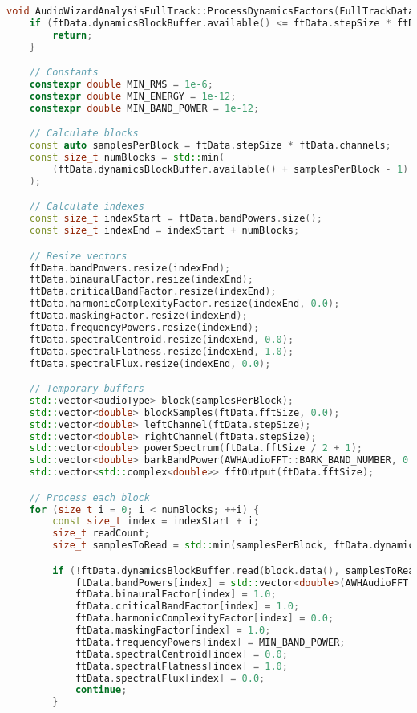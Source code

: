 \documentclass[11pt]{article}
\begin{document}
\begin{lstlisting}[language=C++]
void AudioWizardAnalysisFullTrack::ProcessDynamicsFactors(FullTrackData& ftData) {
	if (ftData.dynamicsBlockBuffer.available() <= ftData.stepSize * ftData.channels) {
		return;
	}

	// Constants
	constexpr double MIN_RMS = 1e-6;
	constexpr double MIN_ENERGY = 1e-12;
	constexpr double MIN_BAND_POWER = 1e-12;

	// Calculate blocks
	const auto samplesPerBlock = ftData.stepSize * ftData.channels;
	const size_t numBlocks = std::min(
		(ftData.dynamicsBlockBuffer.available() + samplesPerBlock - 1) / samplesPerBlock, ftData.pureDynamicsBlockSums.size()
	);

	// Calculate indexes
	const size_t indexStart = ftData.bandPowers.size();
	const size_t indexEnd = indexStart + numBlocks;

	// Resize vectors
	ftData.bandPowers.resize(indexEnd);
	ftData.binauralFactor.resize(indexEnd);
	ftData.criticalBandFactor.resize(indexEnd);
	ftData.harmonicComplexityFactor.resize(indexEnd, 0.0);
	ftData.maskingFactor.resize(indexEnd);
	ftData.frequencyPowers.resize(indexEnd);
	ftData.spectralCentroid.resize(indexEnd, 0.0);
	ftData.spectralFlatness.resize(indexEnd, 1.0);
	ftData.spectralFlux.resize(indexEnd, 0.0);

	// Temporary buffers
	std::vector<audioType> block(samplesPerBlock);
	std::vector<double> blockSamples(ftData.fftSize, 0.0);
	std::vector<double> leftChannel(ftData.stepSize);
	std::vector<double> rightChannel(ftData.stepSize);
	std::vector<double> powerSpectrum(ftData.fftSize / 2 + 1);
	std::vector<double> barkBandPower(AWHAudioFFT::BARK_BAND_NUMBER, 0.0);
	std::vector<std::complex<double>> fftOutput(ftData.fftSize);

	// Process each block
	for (size_t i = 0; i < numBlocks; ++i) {
		const size_t index = indexStart + i;
		size_t readCount;
		size_t samplesToRead = std::min(samplesPerBlock, ftData.dynamicsBlockBuffer.available());

		if (!ftData.dynamicsBlockBuffer.read(block.data(), samplesToRead, &readCount) || readCount == 0) {
			ftData.bandPowers[index] = std::vector<double>(AWHAudioFFT::BARK_BAND_NUMBER, MIN_BAND_POWER);
			ftData.binauralFactor[index] = 1.0;
			ftData.criticalBandFactor[index] = 1.0;
			ftData.harmonicComplexityFactor[index] = 0.0;
			ftData.maskingFactor[index] = 1.0;
			ftData.frequencyPowers[index] = MIN_BAND_POWER;
			ftData.spectralCentroid[index] = 0.0;
			ftData.spectralFlatness[index] = 1.0;
			ftData.spectralFlux[index] = 0.0;
			continue;
		}


\end{lstlisting}
\end{document}
